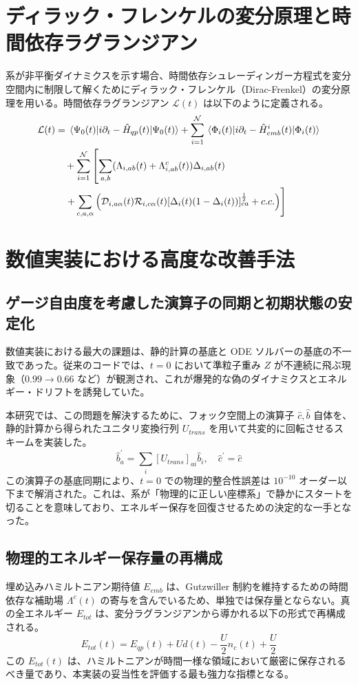 \documentclass[a4paper,11pt]{ltjarticle}
\begin{document}
\section{ディラック・フレンケルの変分原理と時間依存ラグランジアン}
系が非平衡ダイナミクスを示す場合、時間依存シュレーディンガー方程式を変分空間内に制限して解くためにディラック・フレンケル（Dirac-Frenkel）の変分原理を用いる。時間依存ラグランジアン $\mathcal{L}(t)$ は以下のように定義される。
\begin{align}
\mathcal{L}(t) &= \mel{\Psi_0(t)}{i\partial_t - \hat{H}_{qp}(t)}{\Psi_0(t)} + \sum_{i=1}^{\mathcal{N}} \mel{\Phi_i(t)}{i\partial_t - \hat{H}_{emb}^i(t)}{\Phi_i(t)} \notag \\
&\quad + \sum_{i=1}^{\mathcal{N}} \left[ \sum_{a,b} (\Lambda_{i,ab}(t) + \Lambda_{i,ab}^c(t))\Delta_{i,ab}(t) \right. \notag \\
&\quad \left. + \sum_{c,a,\alpha} \left( \mathcal{D}_{i,a\alpha}(t) \mathcal{R}_{i,c\alpha}(t) [\Delta_i(t)(1-\Delta_i(t))]_{ca}^{\frac{1}{2}} + c.c. \right) \right]
\end{align}

\section{数値実装における高度な改善手法}

\subsection{ゲージ自由度を考慮した演算子の同期と初期状態の安定化}
数値実装における最大の課題は、静的計算の基底と ODE ソルバーの基底の不一致であった。従来のコードでは、$t=0$ において準粒子重み $Z$ が不連続に飛ぶ現象（$0.99 \to 0.66$ など）が観測され、これが爆発的な偽のダイナミクスとエネルギー・ドリフトを誘発していた。

本研究では、この問題を解決するために、フォック空間上の演算子 $\hat{c}, \hat{b}$ 自体を、静的計算から得られたユニタリ変換行列 $U_{trans}$ を用いて共変的に回転させるスキームを実装した。
\begin{equation}
    \hat{b}^\prime_a = \sum_i [U_{trans}]_{ai} \hat{b}_i, \quad \hat{c}^\prime = \hat{c}
\end{equation}
この演算子の基底同期により、$t=0$ での物理的整合性誤差は $10^{-10}$ オーダー以下まで解消された。これは、系が「物理的に正しい座標系」で静かにスタートを切ることを意味しており、エネルギー保存を回復させるための決定的な一手となった。

\subsection{物理的エネルギー保存量の再構成}
埋め込みハミルトニアン期待値 $E_{emb}$ は、Gutzwiller 制約を維持するための時間依存な補助場 $\Lambda^c(t)$ の寄与を含んでいるため、単独では保存量とならない。真の全エネルギー $E_{tot}$ は、変分ラグランジアンから導かれる以下の形式で再構成される。
\begin{equation}
    E_{tot}(t) = E_{qp}(t) + U d(t) - \frac{U}{2} n_c(t) + \frac{U}{2}
\end{equation}
この $E_{tot}(t)$ は、ハミルトニアンが時間一様な領域において厳密に保存されるべき量であり、本実装の妥当性を評価する最も強力な指標となる。
\end{document}
